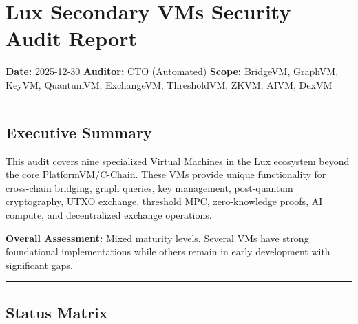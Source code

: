 \documentclass[
]{article}
\author{}
\date{}
\begin{document}
\section{Lux Secondary VMs Security Audit
Report}\label{lux-secondary-vms-security-audit-report}

\textbf{Date:} 2025-12-30 \textbf{Auditor:} CTO (Automated)
\textbf{Scope:} BridgeVM, GraphVM, KeyVM, QuantumVM, ExchangeVM,
ThresholdVM, ZKVM, AIVM, DexVM

\begin{center}\rule{0.5\linewidth}{0.5pt}\end{center}

\subsection{Executive Summary}\label{executive-summary}

This audit covers nine specialized Virtual Machines in the Lux ecosystem
beyond the core PlatformVM/C-Chain. These VMs provide unique
functionality for cross-chain bridging, graph queries, key management,
post-quantum cryptography, UTXO exchange, threshold MPC, zero-knowledge
proofs, AI compute, and decentralized exchange operations.

\textbf{Overall Assessment:} Mixed maturity levels. Several VMs have
strong foundational implementations while others remain in early
development with significant gaps.

\begin{center}\rule{0.5\linewidth}{0.5pt}\end{center}

\subsection{Status Matrix}\label{status-matrix}
\end{document}
